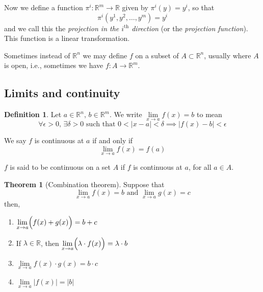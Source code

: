 \documentclass[a4paper,14pt]{extarticle}
\theoremstyle{definition}
\newtheorem*{theorem}{Theorem}
\newtheorem*{definition}{Definition}
\begin{document}
\noindent Now we define a function $\pi^i:\mathbb{R}^m\rightarrow\mathbb{R}$ given by $\pi^i(y)=y^i$, so that
\[\pi^i(y^1,y^2,\ldots,y^m)=y^i\] and we call this the \emph{projection in the $i^{\text{th}}$ direction} (or the \emph{projection function}). This function is a linear transformation.

\begin{center}
\end{center}

Sometimes instead of $\mathbb{R}^n$ we may define $f$ on a subset of $A\subset\mathbb{R}^n$, usually where $A$ is open, i.e., sometimes we have
$f:A\rightarrow\mathbb{R}^m$.

\subsection{Limits and continuity}
\begin{definition}
	Let $a\in\mathbb{R}^n, \,b\in\mathbb{R}^m$. We write $\lim\limits_{x\to a} f(x)=b$ to mean
	\[\forall\epsilon>0, \,\exists\delta>0\text{ such that } 0<|x-a|<\delta\implies|f(x)-b|<\epsilon\]
\end{definition}

\noindent We say $f$ is continuous at $a$ if and only if \[\lim\limits_{x\to a}f(x)= f(a)\]

\noindent $f$ is said to be continuous on a set $A$ if $f$ is continuous at $a$, for all $a\in A$.

\begin{theorem}[Combination theorem]
	Suppose that \[\lim\limits_{x\to a} f(x)=b\text{ and }\lim\limits_{x\to a} g(x)=c\] then,
	\begin{enumerate}
		\item $\lim\limits_{x\to a} \Bigl(f(x)+g(x)\Bigr)=b+c$
		\item If $\lambda\in\mathbb{R}$, then $\lim\limits_{x\to a} \Bigl(\lambda\cdot f(x)\Bigr)=\lambda\cdot b$
		\item $\lim\limits_{x\to a} f(x)\cdot g(x)=b\cdot c$
		\item $\lim\limits_{x\to a} |f(x)|=|b|$
	\end{enumerate}
\end{theorem}
\end{document}

